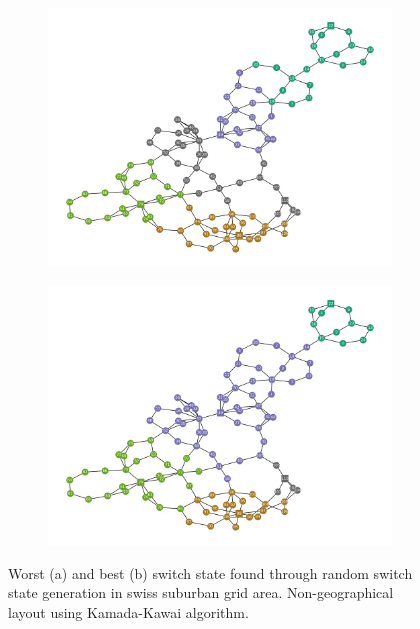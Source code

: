 \begin{figure}[H]
  \begin{subfigure}{.5\textwidth}
      \centering
      \includegraphics[width=\linewidth]{img/switchstate_exploring/swiss_suburb/topology_worst.png}
      \caption{}
      \label{fig:result:suburban:worst}
    \end{subfigure}%
    \begin{subfigure}{.5\textwidth}
      \centering
      \includegraphics[width=\linewidth]{img/switchstate_exploring/swiss_suburb/topology_best.png}
      \caption{}
      \label{fig:result:suburban:best}
    \end{subfigure}
  \caption{
    Worst (a) and best (b) switch state found through random switch
    state generation in swiss suburban grid area. 
    Non-geographical layout using
    Kamada-Kawai algorithm\autocite{kamada_kawai}.
  }


\end{figure}
